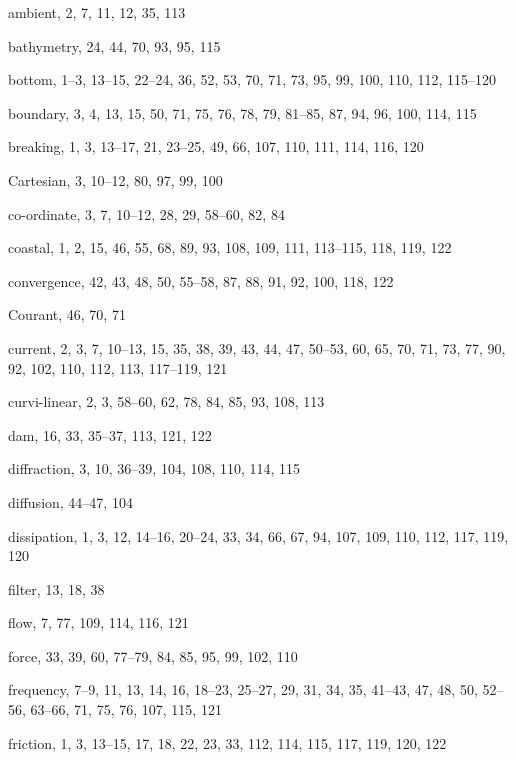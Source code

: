 \documentclass[12pt]{book}
\begin{document}
\begin{theindex}
  \item ambient, 2, 7, 11, 12, 35, 113

  \indexspace

  \item bathymetry, 24, 44, 70, 93, 95, 115
  \item bottom, 1--3, 13--15, 22--24, 36, 52, 53, 70, 71, 73, 95,
		99, 100, 110, 112, 115--120
  \item boundary, 3, 4, 13, 15, 50, 71, 75, 76, 78, 79, 81--85, 87, 94,
		96, 100, 114, 115
  \item breaking, 1, 3, 13--17, 21, 23--25, 49, 66, 107, 110, 111, 114,
		116, 120

  \indexspace

  \item Cartesian, 3, 10--12, 80, 97, 99, 100
  \item co-ordinate, 3, 7, 10--12, 28, 29, 58--60, 82, 84
  \item coastal, 1, 2, 15, 46, 55, 68, 89, 93, 108, 109, 111, 113--115,
		118, 119, 122
  \item convergence, 42, 43, 48, 50, 55--58, 87, 88, 91, 92, 100, 118,
		122
  \item Courant, 46, 70, 71
  \item current, 2, 3, 7, 10--13, 15, 35, 38, 39, 43, 44, 47, 50--53,
		60, 65, 70, 71, 73, 77, 90, 92, 102, 110, 112, 113,
		117--119, 121
  \item curvi-linear, 2, 3, 58--60, 62, 78, 84, 85, 93, 108, 113

  \indexspace

  \item dam, 16, 33, 35--37, 113, 121, 122
  \item diffraction, 3, 10, 36--39, 104, 108, 110, 114, 115
  \item diffusion, 44--47, 104
  \item dissipation, 1, 3, 12, 14--16, 20--24, 33, 34, 66, 67, 94, 107,
		109, 110, 112, 117, 119, 120

  \indexspace

  \item filter, 13, 18, 38
  \item flow, 7, 77, 109, 114, 116, 121
  \item force, 33, 39, 60, 77--79, 84, 85, 95, 99, 102, 110
  \item frequency, 7--9, 11, 13, 14, 16, 18--23, 25--27, 29, 31, 34, 35,
		41--43, 47, 48, 50, 52--56, 63--66, 71, 75, 76, 107,
		115, 121
  \item friction, 1, 3, 13--15, 17, 18, 22, 23, 33, 112, 114, 115, 117,
		119, 120, 122


\end{theindex}
\end{document}
